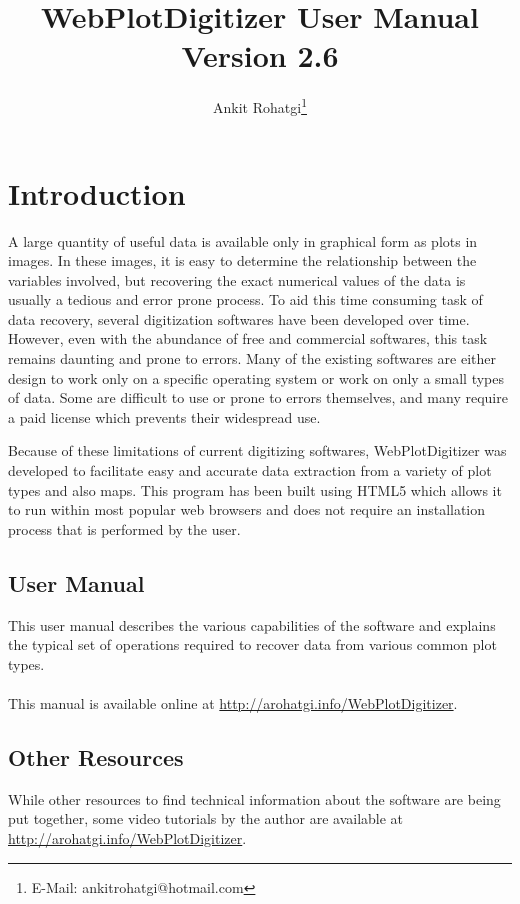 \documentclass[letterpaper]{article}
\begin{document}
\title{WebPlotDigitizer User Manual\\ Version 2.6}
\author{Ankit Rohatgi\footnote{E-Mail: ankitrohatgi@hotmail.com}}
\maketitle
\tableofcontents
\newpage
\section{Introduction}
A large quantity of useful data is available only in graphical form as plots in images. In these images, it is easy to determine the relationship between the variables involved, but recovering the exact numerical values of the data is usually a tedious and error prone process. To aid this time consuming task of data recovery, several digitization softwares have been developed over time. However, even with the abundance of free and commercial softwares, this task remains daunting and prone to errors. Many of the existing softwares are either design to work only on a specific operating system or work on only a small types of data. Some are difficult to use or prone to errors themselves, and many require a paid license which prevents their widespread use.

Because of these limitations of current digitizing softwares, WebPlotDigitizer was developed to facilitate easy and accurate data extraction from a variety of plot types and also maps. This program has been built using HTML5 which allows it to run within most popular web browsers and does not require an installation process that is performed by the user.

\subsection{User Manual}
This user manual describes the various capabilities of the software and explains the typical set of operations required to recover data from various common plot types. 
\\
\\
This manual is available online at \url{http://arohatgi.info/WebPlotDigitizer}.

\subsection{Other Resources}
While other resources to find technical information about the software are being put together, some video tutorials by the author are available at \url{http://arohatgi.info/WebPlotDigitizer}.
\end{document}

